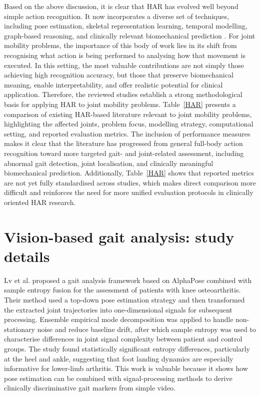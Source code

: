 \documentclass[12pt]{elsarticle}
\begin{document}
Based on the above discussion, it is clear that HAR has evolved well beyond simple action recognition. It now incorporates a diverse set of techniques, including pose estimation, skeletal representation learning, temporal modelling, graph-based reasoning, and clinically relevant biomechanical prediction \cite{kong2022human,debnath2022review,hulleck2022present}. For joint mobility problems, the importance of this body of work lies in its shift from recognising what action is being performed to analysing how that movement is executed. In this setting, the most valuable contributions are not simply those achieving high recognition accuracy, but those that preserve biomechanical meaning, enable interpretability, and offer realistic potential for clinical application. Therefore, the reviewed studies establish a strong methodological basis for applying HAR to joint mobility problems. Table~\ref{HAR} presents a comparison of existing HAR-based literature relevant to joint mobility problems, highlighting the affected joints, problem focus, modelling strategy, computational setting, and reported evaluation metrics. The inclusion of performance measures makes it clear that the literature has progressed from general full-body action recognition toward more targeted gait- and joint-related assessment, including abnormal gait detection, joint localisation, and clinically meaningful biomechanical prediction. Additionally, Table~\ref{HAR} shows that reported metrics are not yet fully standardised across studies, which makes direct comparison more difficult and reinforces the need for more unified evaluation protocols in clinically oriented HAR research.







\section{Vision-based gait analysis: study details}
\label{supp:S5}
Lv et al. \cite{lv2022analysis} proposed a gait analysis framework based on AlphaPose combined with sample entropy fusion for the assessment of patients with knee osteoarthritis. Their method used a top-down pose estimation strategy and then transformed the extracted joint trajectories into one-dimensional signals for subsequent processing. Ensemble empirical mode decomposition was applied to handle non-stationary noise and reduce baseline drift, after which sample entropy was used to characterise differences in joint signal complexity between patient and control groups. The study found statistically significant entropy differences, particularly at the heel and ankle, suggesting that foot landing dynamics are especially informative for lower-limb arthritis. This work is valuable because it shows how pose estimation can be combined with signal-processing methods to derive clinically discriminative gait markers from simple video.
\end{document}
